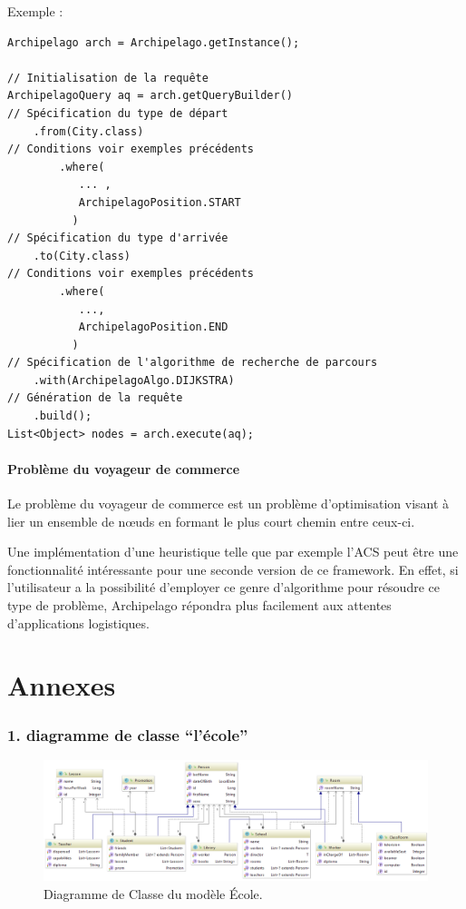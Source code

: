 \documentclass[a4paper,fleqn,12pt,oneside]{report}
\begin{document}
Exemple : 

\begin{lstlisting}
Archipelago arch = Archipelago.getInstance();

// Initialisation de la requête
ArchipelagoQuery aq = arch.getQueryBuilder()
// Spécification du type de départ
    .from(City.class)
// Conditions voir exemples précédents     
    	.where(
    	   ... ,
    	   ArchipelagoPosition.START
    	  )
// Spécification du type d'arrivée
    .to(City.class)
// Conditions voir exemples précédents  
    	.where(
    	   ...,
    	   ArchipelagoPosition.END
    	  )
// Spécification de l'algorithme de recherche de parcours
    .with(ArchipelagoAlgo.DIJKSTRA)
// Génération de la requête
    .build();
List<Object> nodes = arch.execute(aq);
\end{lstlisting}


\subsection*{Problème du voyageur de commerce}

Le problème du voyageur de commerce est un problème d'optimisation visant à lier un ensemble de nœuds en formant le plus court chemin entre ceux-ci.

Une implémentation d'une heuristique telle que par exemple l'ACS\cite{dorigo1997ant} peut être une fonctionnalité intéressante pour une seconde version de ce framework. En effet, si l'utilisateur a la possibilité d'employer ce genre d'algorithme pour résoudre ce type de problème, Archipelago répondra plus facilement aux attentes d'applications logistiques.



 

\part{Annexes}
\section*{1. diagramme de classe \enquote{l'école}}

\begin{figure}[!ht]
	\centering
    \includegraphics[angle=90,origin=c,scale=0.8]{figures/SchoolDiag.png}
    \caption{Diagramme de Classe du modèle École.}
    \label{fig:SchoolDiagram}
\end{figure}
\end{document}
